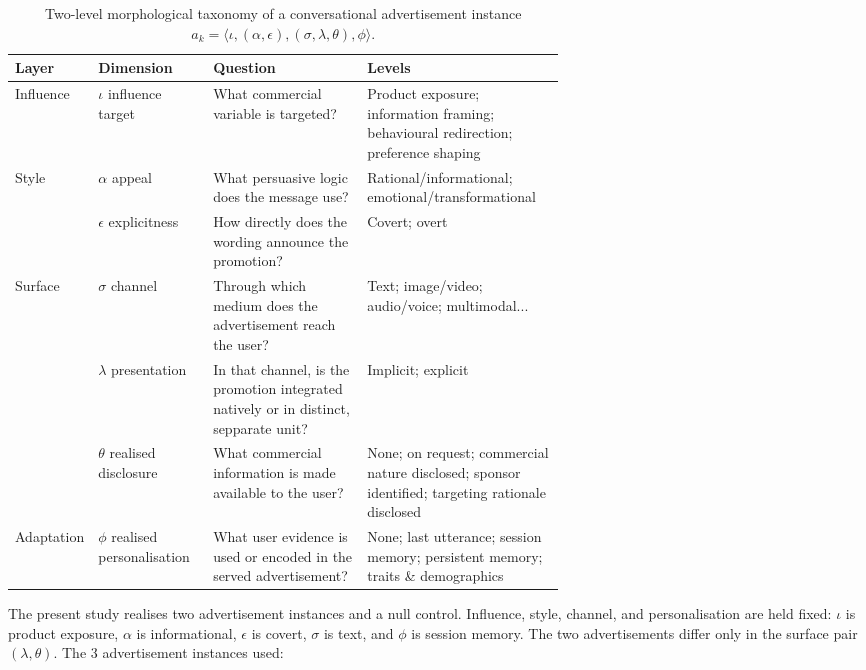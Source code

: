 \documentclass[english]{article}
\begin{document}
\begin{table}[H]
\centering
\small
\caption{Two-level morphological taxonomy of a conversational
advertisement instance
\(a_k=\langle\iota,(\alpha,\epsilon),(\sigma,\lambda,\theta),\phi\rangle\).}
\label{tab:ad-taxonomy}
\begin{tabular}{ll p{0.28\linewidth} p{0.36\linewidth}}
\toprule
\textbf{Layer} & \textbf{Dimension} & \textbf{Question} & \textbf{Levels} \\
\midrule
Influence
& \(\iota\) influence target
& What commercial variable is targeted?
& Product exposure; information framing; behavioural redirection;
preference shaping
\cite{qiu2026generative}
\\
\midrule
Style
& \(\alpha\) appeal
& What persuasive logic does the message use?
& Rational/informational; emotional/transformational
\cite{puto1984informational,nuweihed2024informational,heineking2026detecting}
\\
& \(\epsilon\) explicitness
& How directly does the wording announce the promotion?
& Covert; overt
\cite{heineking2026detecting}
\\
\midrule
Surface
& \(\sigma\) channel
& Through which medium does the advertisement reach the user?
& Text; image/video; audio/voice; multimodal...
\cite{qiu2026generative,jannach2021crs}
\\
& \(\lambda\) presentation
& In that channel, is the promotion integrated natively or in distinct, sepparate unit?
& Implicit; explicit
\\
& \(\theta\) realised disclosure
& What commercial information is made available to the user?
& None; on request; commercial nature disclosed; sponsor identified;
targeting rationale disclosed
\cite{tang2025adstalkbackimplications,openai_ads_chatgpt}
\\
\midrule
Adaptation
& \(\phi\) realised personalisation
& What user evidence is used or encoded in the served advertisement?
& None; last utterance; session memory; persistent memory; traits \& demographics
\cite{jannach2021crs,meguellati2025llmads,openai_ads_chatgpt}
\\
\bottomrule
\end{tabular}
\end{table}

The present study realises two advertisement instances and a null
control. Influence, style, channel, and personalisation are held fixed:
\(\iota\) is product exposure,
\(\alpha\) is informational,
\(\epsilon\) is covert,
\(\sigma\) is text, and
\(\phi\) is session memory. The two advertisements differ only in the
surface pair \((\lambda,\theta)\). The 3 advertisement instances used:
\end{document}
